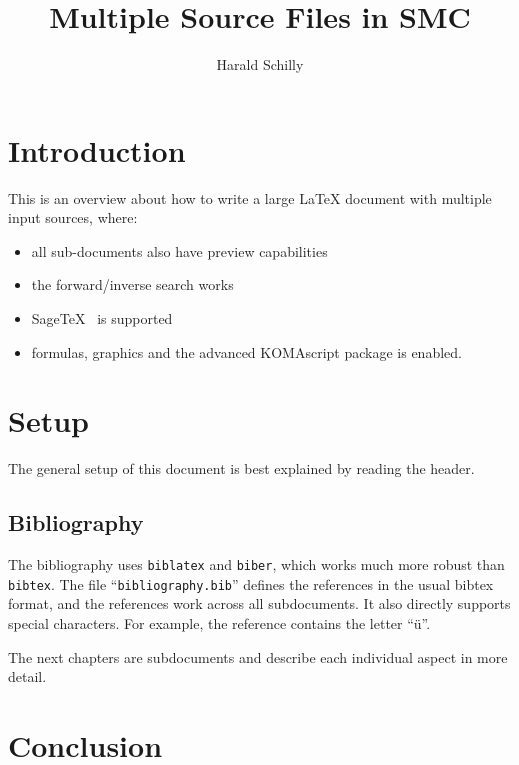\documentclass[12pt,
     DIV=12,
     twoside=false,
     twocolumn=false,
     abstraction,
     dottedtoc,
     headings=normal,
     headinclude=true,
     footinclude=true,
     parskip=half]{scrbook}
\title{Multiple Source Files in SMC}
\author{Harald Schilly}
\let\orgLaTeX\LaTeX
\renewcommand*{\LaTeX}{\orgLaTeX\xspace}
\begin{document}
\maketitle

\chapter{Introduction}

This is an overview about how to write a large \LaTeX document
with multiple input sources, where:

\begin{itemize}
\item all sub-documents also have preview capabilities
\item the forward/inverse search works
\item SageTeX~\cite{sagetex} is supported
\item formulas, graphics and the advanced KOMAscript package is enabled.
\end{itemize}


\tableofcontents

\chapter{Setup}

The general setup of this document is best explained by reading the header.

\section{Bibliography}

The bibliography uses \texttt{biblatex} and \texttt{biber},
which works much more robust than \texttt{bibtex}.
The file ``\texttt{bibliography.bib}'' defines the references
in the usual bibtex format,
and the references work across all subdocuments.
It also directly supports special characters. For example, the \cite{komascript} reference contains the letter ``ü''.

The next chapters are subdocuments and describe each individual aspect in more detail.






\chapter{Conclusion}

\printbibliography
\end{document}
